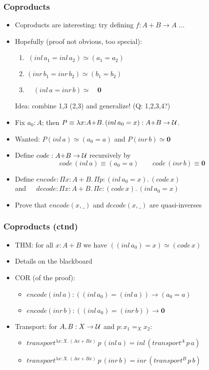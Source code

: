 \documentclass[handout]{beamer}
\newcommand{\depi}[3]{\Pi{#1{:}#2.\,#3}}
\newcommand{\lamt}[3]{\lambda{#1{:}#2.\,#3}}
\newcommand{\UU}{{\cal U}}
\newcommand{\bfnull}{\mathbf{0}}
\begin{document}
 \frame
  {

    \frametitle{Coproducts}

    \begin{itemize}[<+->]
    \item Coproducts are interesting: try defining $f: A+B \to A$ ...
    \item Hopefully (proof not obvious, too special):
      \begin{enumerate}[<+->]
      \item $~(inl\,a_1 = inl\,a_2)\simeq(a_1 = a_2)$
      \item $(inr\,b_1 = inr\,b_2)\simeq(b_1 = b_2)$
      \item $\quad(inl\,a = inr\,b)\simeq \quad\bfnull$
      \end{enumerate}
      Idea: combine 1,3 (2,3) and generalize! (Q: 1,2,3,4?)
    \item Fix $a_0:A$; then $P\equiv\lamt{x}{A{+}B}{(inl\,a_0 = x)}: A{+}B \to\UU$. 
    \item Wanted: $P(inl\,a)\simeq(a_0 = a)$ and $P(inr\,b)\simeq\bfnull$
    \item Define $code: A{+}B \to\UU$ recursively by 
          $$code\,(inl\,a) \equiv (a_0 = a)\quad\quad code\,(inr\,b) \equiv\bfnull$$
    \item Define $encode: \depi{x}{A{+}B}{\depi{p}{(inl\,a_0=x)}{(code\,x)}}$\\ 
             and $\,\quad decode: \depi{x}{A{+}B}{\depi{c}{(code\,x)}{(inl\,a_0=x)}}$
    \item Prove that $encode(x,\_)$ and $decode(x,\_)$ are quasi-inverses
    \end{itemize}
  }

 \frame
  {

    \frametitle{Coproducts (ctnd)}

    \begin{itemize}[<+->]
    \item THM: for all $x:A+B$ we have $((inl\,a_0)=x)\simeq(code\,x)$
    \item Details on the blackboard
    \item COR (of the proof):
      \begin{itemize}[<+->]
      \item $encode(inl\,a): ((inl\,a_0) = (inl\, a)) \to(a_0 = a)$
      \item $encode(inr\,b): ((inl\,a_0) = (inr\, b)) \to\bfnull$
      \end{itemize}
    \item Transport: for $A,B:X\to\UU$ and $p:x_1 =_X x_2$:
      \begin{itemize}[<+->]
      \item $transport^{\lamt{x}{X}{(Ax{+}Bx)}}\,p\,(inl\,a) = inl\,(transport^A\,p\,a)$
      \item $transport^{\lamt{x}{X}{(Ax{+}Bx)}}\,p\,(inr\,b) = inr\,(transport^B\,p\,b)$
      \end{itemize}
    \end{itemize}
  }
\end{document}
